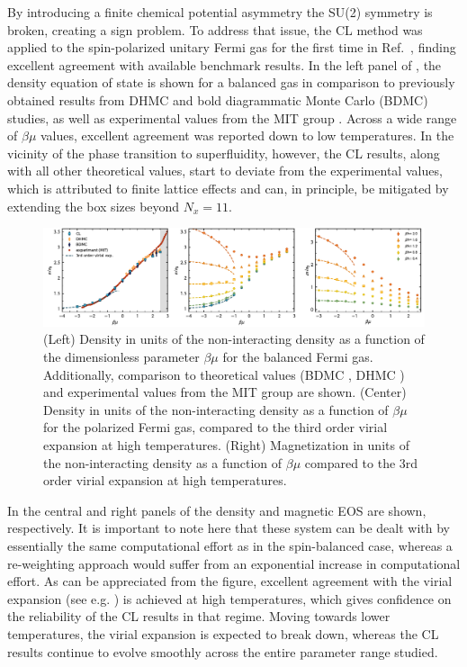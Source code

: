 \documentclass[../main.tex]{subfiles}
\begin{document}
By introducing a finite chemical potential asymmetry the SU(2) symmetry is broken, creating a sign problem. To address that issue, the CL method was applied to the spin-polarized unitary Fermi gas for the first time in Ref.~\cite{2018UFGviaCL}, finding excellent agreement with available benchmark results. In the left panel of , the density equation of state is shown for a balanced gas in comparison to previously obtained results from DHMC \cite{PhysRevA.85.051601} and bold diagrammatic Monte Carlo (BDMC) \cite{VanHoucke2012} studies, as well as experimental values from the MIT group \cite{VanHoucke2012}. Across a wide range of $\beta\mu$ values, excellent agreement was reported down to low temperatures.
In the vicinity of the phase transition to superfluidity, however, the CL results, along with all other theoretical values, start to deviate from the experimental values, which is attributed to finite lattice effects and can, in principle, be mitigated by extending the box sizes beyond $N_x = 11$.
%
\begin{figure}[t]
  \centering
  \includegraphics[width=\columnwidth]{./5applications-NREL/ufg_eos.pdf}
  \caption{\label{fig:ufg_eos} (Left) Density in units of the non-interacting density as a function of the dimensionless parameter $\beta \mu$ for the balanced Fermi gas. Additionally, comparison to theoretical values (BDMC \cite{VanHoucke2012}, DHMC \cite{PhysRevA.85.051601}) and experimental values from the MIT group \cite{VanHoucke2012} are shown. (Center) Density in units of the non-interacting density as a function of $\beta \mu$ for the polarized Fermi gas, compared to the third order virial expansion at high temperatures. (Right) Magnetization in units of the non-interacting density as a function of $\beta \mu$ compared to the 3rd order virial expansion at high temperatures.}
\end{figure}
%

In the central and right panels of  the density and magnetic EOS are shown, respectively. It is important to note here that these system can be dealt with by essentially the same computational effort as in the spin-balanced case, whereas a re-weighting approach would suffer from an exponential increase in computational effort. As can be appreciated from the figure, excellent agreement with the virial expansion (see e.g. \cite{LIU201337}) is achieved at high temperatures, which gives confidence on the reliability of the CL results in that regime. Moving towards lower temperatures, the virial expansion is expected to break down, whereas the CL results continue to evolve smoothly across the entire parameter range studied.
\end{document}
